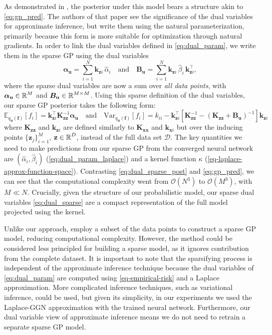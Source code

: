 \documentclass{article}
\newcommand{\dataset}{\ensuremath{\mathcal{D}}}
\newcommand{\mathbold}[1]{\bm{#1}}
\newcommand{\mbf}[1]{\mathbf{#1}}
\newcommand{\T}{\top}
\newcommand{\valpha}[0]{\mathbold{\alpha}}
\newcommand{\MBeta}[0]{\mathbold{B}}
\newcommand{\vz}{\mbf{z}}
\newcommand{\vf}{\mbf{f}}
\newcommand{\vu}{\mbf{u}}
\newcommand{\vx}{\mbf{x}}
\newcommand{\MKzz}{\mbf{K}_{\mbf{z}\mbf{z}}}
\newcommand{\MKxx}{\mbf{K}_{\mbf{x}\mbf{x}}}
\newcommand{\vkzi}{\mbf{k}_{\mbf{z}i}}
\newcommand{\vkzs}{\mbf{k}_{\mbf{z}i}}
\newcommand{\vk}{\mbf{k}}
\newcommand{\myexpect}{\mathbb{E}}
\begin{document}
As demonstrated in \cite{adam2021dual}, the posterior under this model bears a structure akin to \cref{eq:gp_pred}. The authors of that paper see the significance of the dual variables for approximate inference, but write them using the natural parameterization, primarily because this form is more suitable for optimization through natural gradients. In order to link the dual variables defined in \cref{eq:dual_param}, we write them in the sparse GP using the dual variables
%
\begin{equation} \textstyle
  \valpha_{\vu}  =  \sum_{i=1}^N  \vkzi \, \hat{\alpha}_{i}
  \quad \text{and} \quad
  \MBeta_{\vu} =  \sum_{i=1}^N \vkzi \,\hat{\beta}_{i} \, \vkzi^{\T} ,    
\label{eq:dual_sparse}
\end{equation}
%
where the sparse dual variables are now a sum over \emph{all data points}, with $\valpha_{\vu} \in \R^{M}$ and $\MBeta_{\vu} \in \R^{M  \times M}$. Using this sparse definition of the dual variables, our sparse GP posterior takes the following form:
\begin{equation}\label{eq:dual_sparse_post}
   \myexpect_{q_{\vu}(\vf)}[f_i] = \vkzs^{\T} \MKzz^{-1} \valpha_{\vu}
   \quad \text{and} \quad 
   \textrm{Var}_{q_{\vu}(\vf)}[f_i]  = k_{ii} - \vkzs^\top [\MKzz^{-1} - (\MKzz + \MBeta_{\vu})^{-1} ]\vkzs
\end{equation}
where $\MKzz$ and $\vkzs$ are defined similarly to $\MKxx$ and $\vk_{\vx i}$ but over the inducing points $\{\vz_j\}_{i=1}^M$, $\vz \in \R^{D}$, instead of the full data set $\dataset$. The key quantities we need to make predictions from our sparse GP from the converged neural network are $(\hat{\alpha}_i, \hat{\beta}_i)$ (\cref{eq:dual_param_laplace}) and a kernel function $\kappa$ (\cref{eq-laplace-approx-function-space}). Contrasting \cref{eq:dual_sparse_post} and \cref{eq:gp_pred}, we can see that the computational complexity went from $\mathcal{O}(N^3)$ to $\mathcal{O}(M^3)$, with $M \ll N$.  Crucially, given the structure of our probabilistic model, our sparse dual variables \cref{eq:dual_sparse} are a compact representation of the full model projected using the kernel. 

Unlike our approach, \citet{immer2021improving} employ a subset of the data points to construct a sparse GP model, reducing computational complexity. However, the method could be considered less principled for building a sparse model, as it ignores contribution from the complete dataset. It is important to note that the sparsifying process is independent of the approximate inference technique because the dual variables of \cref{eq:dual_param} are computed using \cref{eq-empirical-risk} and a Laplace approximation. More complicated inference techniques, such as variational inference, could be used, but given its simplicity, in our experiments we used the Laplace-GGN approximation with the trained neural network. Furthermore, our dual variable view of approximate inference means we do not need to retrain a separate sparse GP model.%
\end{document}
